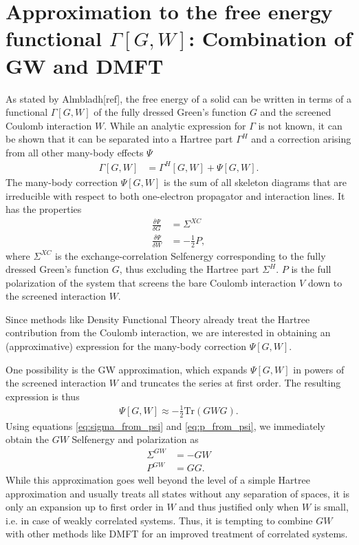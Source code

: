 \documentclass[12pt,a4paper]{scrartcl}
\numberwithin{equation}{section}
\begin{document}
\section{Approximation to the free energy functional $\Gamma[G,W]$: Combination of GW and DMFT}
As stated by Almbladh[ref], the free energy of a solid can be written in terms of
a functional $\Gamma[G,W]$ of the fully dressed Green's function $G$
and the screened Coulomb interaction $W$. While an analytic expression for 
$\Gamma$ is not known, it can be shown that it can be separated into 
a Hartree part $\Gamma^H$ and a correction arising from all other many-body effects
$\Psi$
\begin{align}
\Gamma[G,W] &= \Gamma^H[G,W] + \Psi[G,W].
\end{align}
The many-body correction $\Psi[G,W]$ is the sum of all skeleton diagrams that are
irreducible with respect to both one-electron propagator and
interaction lines. It has the properties
\begin{align}
\frac{\delta \Psi}{\delta G} &= \Sigma^{XC}  \label{eq:sigma_from_psi} \\
\frac{\delta \Psi}{\delta W} &= -\frac{1}{2}P \label{eq:p_from_psi},
\end{align}
where $\Sigma^{XC}$ is the exchange-correlation Selfenergy corresponding to the
fully dressed Green's function $G$, thus excluding the Hartree part $\Sigma^H$.
$P$ is the full polarization of the system that screens the bare Coulomb
interaction $V$ down to the screened interaction $W$.

Since methods like Density Functional Theory already treat the Hartree contribution
from the Coulomb interaction, we are interested in obtaining
an (approximative) expression for the many-body correction $\Psi[G,W]$.

One possibility is the GW approximation, which expands $\Psi[G,W]$ in powers of the
screened interaction $W$ and truncates the series at first order. The resulting expression
is thus
\begin{align}
\Psi[G,W] \approx -\frac{1}{2} \mathrm{Tr}(GWG).
\end{align}
Using equations \eqref{eq:sigma_from_psi} and \eqref{eq:p_from_psi},
we immediately obtain the $GW$ Selfenergy and polarization as
\begin{align}
\Sigma^{GW} &= -GW \\
P^{GW} &= GG.
\end{align}
While this approximation goes well beyond the level of a simple Hartree approximation
and usually treats all states without any separation of spaces,
it is only an expansion up to first order in $W$ and thus justified only when $W$ is
small, i.e. in case of weakly correlated systems. Thus, it is tempting to combine
$GW$ with other methods like DMFT for an improved treatment of correlated systems.
\end{document}
